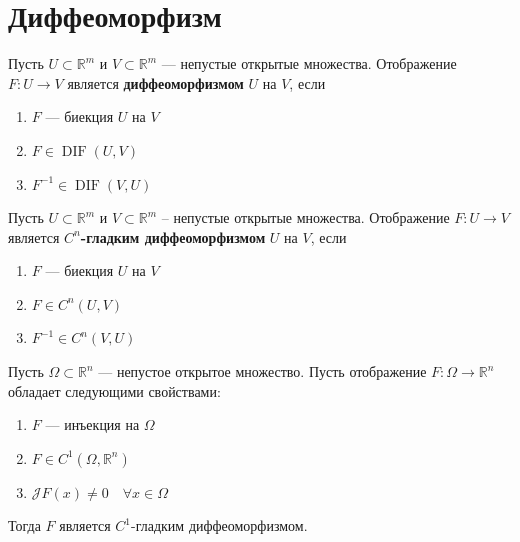 \documentclass[11pt]{article}
\DeclareMathOperator{\DIF}{DIF}
\begin{document}
\section{Диффеоморфизм}

\begin{definition}
    Пусть $U \subset \mathbb{R}^m$ и $V \subset \mathbb{R}^m$ --- непустые 
    открытые множества. Отображение $F \colon U \to V$ является \textbf{диффеоморфизмом} 
    $U$ на $V$, если 
    \begin{enumerate}
        \item $F$ --- биекция $U$ на $V$
        \item $F \in \DIF (U, V)$
        \item $F^{-1} \in \DIF (V, U)$
    \end{enumerate}
\end{definition}

\begin{definition}
    Пусть $U \subset \mathbb{R}^m$ и $V \subset \mathbb{R}^m$ -- непустые 
    открытые множества. Отображение $F \colon U \to V$ является \textbf{$C^n$-гладким 
    диффеоморфизмом} $U$ на $V$, если 
    \begin{enumerate}
        \item $F$ --- биекция $U$ на $V$
        \item $F \in C^n (U, V)$
        \item $F^{-1} \in C^n (V, U)$
    \end{enumerate}
\end{definition}

\begin{theorem}
    Пусть $\Omega \subset \mathbb{R}^n$ --- непустое открытое множество. 
    Пусть отображение $F \colon \Omega \to \mathbb{R}^n$ обладает следующими свойствами: 
    \begin{enumerate}
        \item $F$ --- инъекция на $\Omega$
        \item $F \in C^1(\Omega, \mathbb{R}^n)$
        \item $\mathcal{J} F(x) \neq 0 \quad \forall x \in \Omega$
    \end{enumerate}
    Тогда $F$ является $C^1 \text{-гладким}$ диффеоморфизмом.
\end{theorem}
\end{document}
